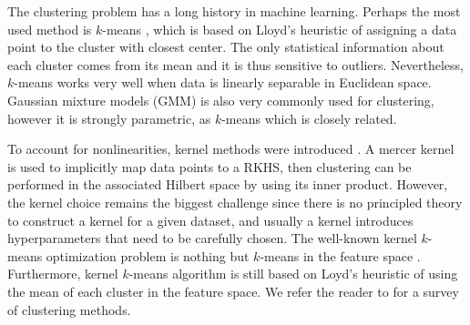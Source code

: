 \documentclass[aps,preprint,nofootinbib,floatfix]{revtex4-1}
\begin{document}
The clustering problem has a long history in machine learning.
Perhaps the most used method is $k$-means \cite{Lloyd,MacQueen,Forgy}, which
is based on Lloyd's heuristic \cite{Lloyd} of assigning a data point to
the cluster with closest center. The only statistical 
information about each cluster
comes from its mean and it is thus sensitive to outliers. 
Nevertheless,
$k$-means works very well when data is linearly separable 
in Euclidean space.
Gaussian mixture models (GMM) is also very commonly used for
clustering,
however it is strongly parametric, as $k$-means which is closely related.

To account for nonlinearities, kernel methods were introduced 
\cite{Smola,Girolami}. A mercer kernel \cite{Mercer} is used to implicitly
map data points to a RKHS, then clustering can be performed in the associated
Hilbert
space by using its inner product. 
However, the kernel choice remains the biggest challenge
since there is no principled theory to construct a kernel for a given
dataset,
and usually a kernel introduces hyperparameters that need to be carefully
chosen.
The well-known
kernel $k$-means optimization problem is nothing but $k$-means in the
feature space \cite{Girolami}. Furthermore, kernel $k$-means algorithm
\cite{Dhillon2,Dhillon} is still based on Loyd's heuristic \cite{Lloyd} of
using the mean of each cluster in the feature space. 
We refer the reader to \cite{Filippone} for a survey of clustering
methods.
\end{document}
